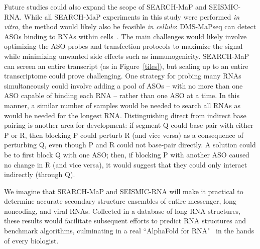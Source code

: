 \documentclass[main.tex]{subfiles}
\begin{document}
Future studies could also expand the scope of SEARCH-MaP and SEISMIC-RNA.
While all SEARCH-MaP experiments in this study were performed \textit{in vitro}, the method would likely also be feasible \textit{in cellulo}: DMS-MaPseq can detect ASOs binding to RNAs within cells~\cite{Zhu2022}.
The main challenges would likely involve optimizing the ASO probes and transfection protocols to maximize the signal while minimizing unwanted side effects such as immunogenicity.
SEARCH-MaP can screen an entire transcript (as in Figure~\ref{tiles}), but scaling up to an entire transcriptome could prove challenging.
One strategy for probing many RNAs simultaneously could involve adding a pool of ASOs -- with no more than one ASO capable of binding each RNA -- rather than one ASO at a time.
In this manner, a similar number of samples would be needed to search all RNAs as would be needed for the longest RNA.
Distinguishing direct from indirect base pairing is another area for development: if segment Q could base-pair with either P or R, then blocking P could perturb R (and vice versa) as a consequence of perturbing Q, even though P and R could not base-pair directly.
A solution could be to first block Q with one ASO; then, if blocking P with another ASO caused no change in R (and vice versa), it would suggest that they could only interact indirectly (through Q).

We imagine that SEARCH-MaP and SEISMIC-RNA will make it practical to determine accurate secondary structure ensembles of entire messenger, long noncoding, and viral RNAs.
Collected in a database of long RNA structures, these results would facilitate subsequent efforts to predict RNA structures and benchmark algorithms, culminating in a real ``AlphaFold for RNA"~\cite{Schneider2023} in the hands of every biologist.
\end{document}
